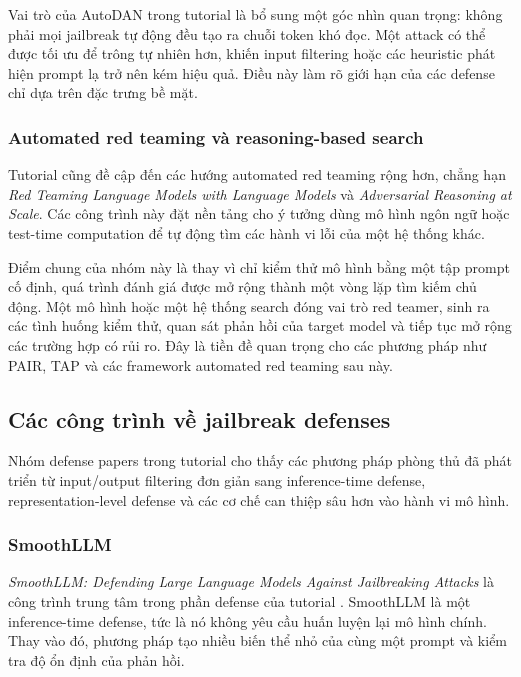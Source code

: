 Vai trò của AutoDAN trong tutorial là bổ sung một góc nhìn quan trọng:
không phải mọi jailbreak tự động đều tạo ra chuỗi token khó đọc. Một attack
có thể được tối ưu để trông tự nhiên hơn, khiến input filtering hoặc các
heuristic phát hiện prompt lạ trở nên kém hiệu quả. Điều này làm rõ giới
hạn của các defense chỉ dựa trên đặc trưng bề mặt.

\subsubsection{Automated red teaming và reasoning-based search}

Tutorial cũng đề cập đến các hướng automated red teaming rộng hơn, chẳng
hạn \textit{Red Teaming Language Models with Language Models}
\cite{perez2022redteaming} và \textit{Adversarial Reasoning at Scale}. Các
công trình này đặt nền tảng cho ý tưởng dùng mô hình ngôn ngữ hoặc
test-time computation để tự động tìm các hành vi lỗi của một hệ thống khác.

Điểm chung của nhóm này là thay vì chỉ kiểm thử mô hình bằng một tập prompt
cố định, quá trình đánh giá được mở rộng thành một vòng lặp tìm kiếm chủ
động. Một mô hình hoặc một hệ thống search đóng vai trò red teamer, sinh ra
các tình huống kiểm thử, quan sát phản hồi của target model và tiếp tục mở
rộng các trường hợp có rủi ro. Đây là tiền đề quan trọng cho các phương
pháp như PAIR, TAP và các framework automated red teaming sau này.

\subsection{Các công trình về jailbreak defenses}
\label{subsec:defense-papers}

Nhóm defense papers trong tutorial cho thấy các phương pháp phòng thủ đã
phát triển từ input/output filtering đơn giản sang inference-time defense,
representation-level defense và các cơ chế can thiệp sâu hơn vào hành vi
mô hình.

\subsubsection{SmoothLLM}

\textit{SmoothLLM: Defending Large Language Models Against Jailbreaking
Attacks} là công trình trung tâm trong phần defense của tutorial
\cite{robey2023smoothllm}. SmoothLLM là một inference-time defense, tức là
nó không yêu cầu huấn luyện lại mô hình chính. Thay vào đó, phương pháp tạo
nhiều biến thể nhỏ của cùng một prompt và kiểm tra độ ổn định của phản hồi.

